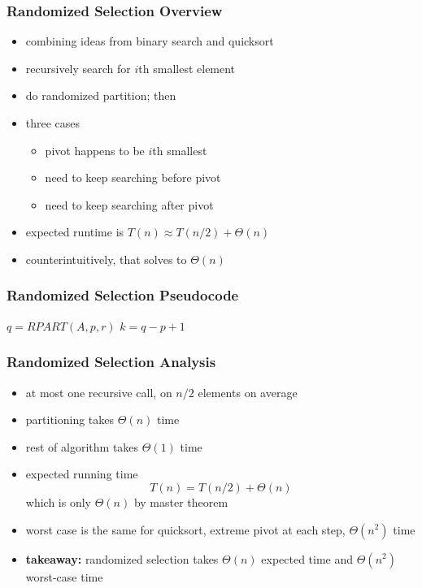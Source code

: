 \documentclass[10pt,aspectratio=169]{beamer}
\begin{document}
\begin{frame} \frametitle{Randomized Selection Overview}
\begin{itemize}
  \item combining ideas from binary search and quicksort
  \item recursively search for $i$th smallest element
  \item do randomized partition; then
  \item three cases
    \begin{itemize}
      \item pivot happens to be $i$th smallest
      \item need to keep searching before pivot
      \item need to keep searching after pivot
    \end{itemize}
  \item expected runtime is $T(n) \approx T(n/2) + \Theta(n)$
  \item counterintuitively, that solves to $\Theta(n)$
  \end{itemize}
\end{frame}

\begin{frame} \frametitle{Randomized Selection Pseudocode}
  \begin{algorithmic}[1]
      \State {} 
    \EndIf
    \State $q = RPART(A, p, r)$ 
    \State $k = q - p + 1$ 
      \State {} 
      \State {}
    \Else
      \State {} 
    \EndIf
    \EndFunction
  \end{algorithmic}
\end{frame}

\begin{frame} \frametitle{Randomized Selection Analysis}
\begin{itemize}
  \item at most one recursive call, on $n/2$ elements on average
  \item partitioning takes $\Theta(n)$ time
  \item rest of algorithm takes $\Theta(1)$ time
  \item expected running time
    \[ T(n) = T(n/2) + \Theta(n) \]
    which is only $\Theta(n)$ by master theorem
  \item worst case is the same for quicksort, extreme pivot at each step,
    $\Theta(n^2)$ time
  \item \textbf{takeaway:} randomized selection takes $\Theta(n)$ expected time
    and $\Theta(n^2)$ worst-case time
  \end{itemize}
\end{frame}
\end{document}
